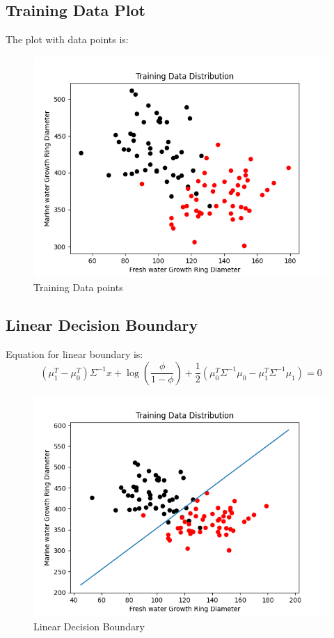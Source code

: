 \documentclass[12pt]{article}
\begin{document}
\subsection{Training Data Plot} The plot with data points is:
\begin{figure}[H]
\centering
  \includegraphics[width=\linewidth]{gdaDecsionBoundary.png}
  \caption{Training Data points}
  \label{fig4A}
\end{figure}
\subsection{Linear Decision Boundary} Equation for linear boundary is:
\begin{equation}
    \left(\mu_{1}^{T}-\mu_{0}^{T}\right) \Sigma^{-1} x+\log \left(\frac{\phi}{1-\phi}\right)+\frac{1}{2}\left(\mu_{0}^{T} \Sigma^{-1} \mu_{0}-\mu_{1}^{T} \Sigma^{-1} \mu_{1}\right)=0
\end{equation}
\begin{figure}[H]
  \includegraphics[width=\linewidth]{linearGdaDecsionBoundary.png}
  \caption{Linear Decision Boundary}
  \label{fig4B}
\end{figure}
\end{document}
